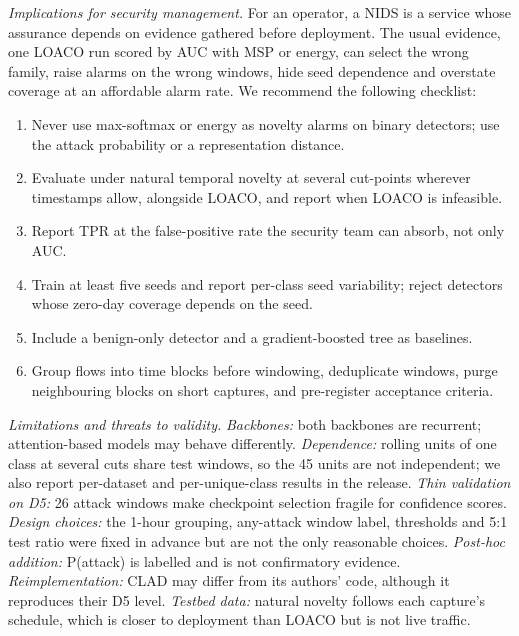 \documentclass[conference]{IEEEtran}
\begin{document}
\emph{Implications for security management.} For an operator, a NIDS is a service whose assurance depends on evidence gathered before deployment. The usual evidence, one LOACO run scored by AUC with MSP or energy, can select the wrong family, raise alarms on the wrong windows, hide seed dependence and overstate coverage at an affordable alarm rate. We recommend the following checklist:
\begin{enumerate}
\item Never use max-softmax or energy as novelty alarms on binary detectors; use the attack probability or a representation distance.
\item Evaluate under natural temporal novelty at several cut-points wherever timestamps allow, alongside LOACO, and report when LOACO is infeasible.
\item Report TPR at the false-positive rate the security team can absorb, not only AUC.
\item Train at least five seeds and report per-class seed variability; reject detectors whose zero-day coverage depends on the seed.
\item Include a benign-only detector and a gradient-boosted tree as baselines.
\item Group flows into time blocks before windowing, deduplicate windows, purge neighbouring blocks on short captures, and pre-register acceptance criteria.
\end{enumerate}

\emph{Limitations and threats to validity.} \emph{Backbones:} both backbones are recurrent; attention-based models may behave differently. \emph{Dependence:} rolling units of one class at several cuts share test windows, so the 45 units are not independent; we also report per-dataset and per-unique-class results in the release. \emph{Thin validation on D5:} 26 attack windows make checkpoint selection fragile for confidence scores. \emph{Design choices:} the 1-hour grouping, any-attack window label, thresholds and 5:1 test ratio were fixed in advance but are not the only reasonable choices. \emph{Post-hoc addition:} P(attack) is labelled and is not confirmatory evidence. \emph{Reimplementation:} CLAD may differ from its authors' code, although it reproduces their D5 level. \emph{Testbed data:} natural novelty follows each capture's schedule, which is closer to deployment than LOACO but is not live traffic.
\end{document}
